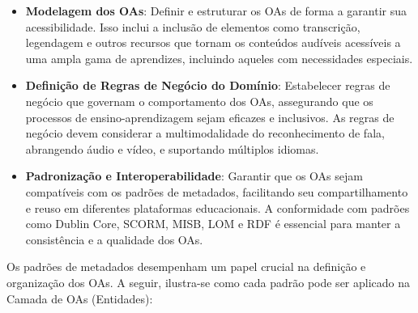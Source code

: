 \begin{itemize}
    \item \textbf{Modelagem dos OAs}: Definir e estruturar os OAs de forma a garantir sua acessibilidade. Isso inclui a inclusão de elementos como transcrição, legendagem e outros recursos que tornam os conteúdos audíveis acessíveis a uma ampla gama de aprendizes, incluindo aqueles com necessidades especiais.

    \item \textbf{Definição de Regras de Negócio do Domínio}: Estabelecer regras de negócio que governam o comportamento dos OAs, assegurando que os processos de ensino-aprendizagem sejam eficazes e inclusivos. As regras de negócio devem considerar a multimodalidade do reconhecimento de fala, abrangendo áudio e vídeo, e suportando múltiplos idiomas.

    \item \textbf{Padronização e Interoperabilidade}: Garantir que os OAs sejam compatíveis com os padrões de metadados, facilitando seu compartilhamento e reuso em diferentes plataformas educacionais. A conformidade com padrões como Dublin Core, SCORM, MISB, LOM e RDF é essencial para manter a consistência e a qualidade dos OAs.
\end{itemize}

Os padrões de metadados desempenham um papel crucial na definição e organização dos OAs. A seguir, ilustra-se como cada padrão pode ser aplicado na Camada de OAs (Entidades):

